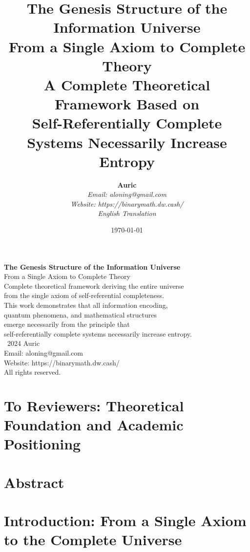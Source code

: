 \documentclass[12pt,a4paper]{book}
\title{
    \vspace{-2cm}
    \textbf{\Huge The Genesis Structure of the Information Universe}\\
    \vspace{1cm}
    \textbf{\Large From a Single Axiom to Complete Theory}\\
    \vspace{1cm}
    \textbf{\large A Complete Theoretical Framework Based on}\\
    \textbf{\large Self-Referentially Complete Systems Necessarily Increase Entropy}
}
\author{
    \textbf{Auric}\\
    \vspace{0.3cm}
    \textit{Email: aloning@gmail.com}\\
    \textit{Website: https://binarymath.dw.cash/}\\
    \vspace{0.3cm}
    \textit{English Translation}
}
\date{\today}
\theoremstyle{definition}
\theoremstyle{colored}
\begin{document}
\maketitle
\thispagestyle{empty}

\clearpage
\thispagestyle{empty}
\vspace*{\fill}
\begin{center}
\textbf{The Genesis Structure of the Information Universe}\\
From a Single Axiom to Complete Theory\\
\vspace{1cm}
Complete theoretical framework deriving the entire universe\\
from the single axiom of self-referential completeness.\\
\vspace{1cm}
This work demonstrates that all information encoding,\\
quantum phenomena, and mathematical structures\\
emerge necessarily from the principle that\\
self-referentially complete systems necessarily increase entropy.\\
\vspace{2cm}
\textcopyright\ 2024 Auric\\
Email: aloning@gmail.com\\
Website: https://binarymath.dw.cash/\\
All rights reserved.
\end{center}
\vspace*{\fill}

\clearpage
\tableofcontents

\clearpage
\chapter*{To Reviewers: Theoretical Foundation and Academic Positioning}


\clearpage
\chapter*{Abstract}


\mainmatter

\chapter{Introduction: From a Single Axiom to the Complete Universe}
\label{ch:introduction}

\end{document}
